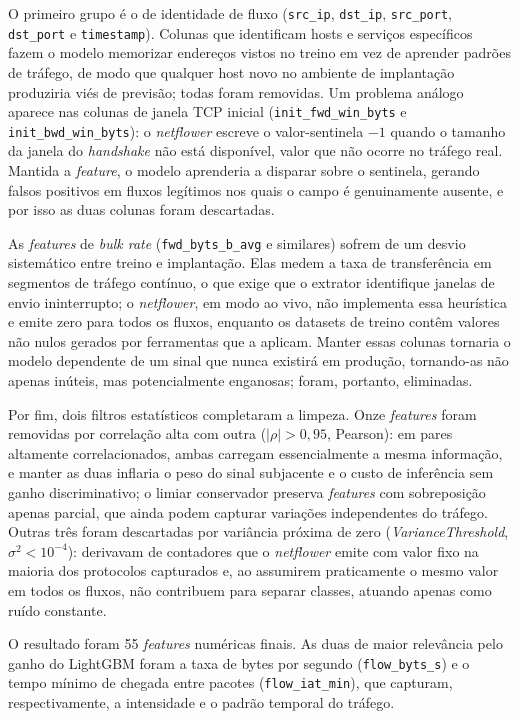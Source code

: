 \documentclass[12pt]{article}
\begin{document}
O primeiro grupo é o de identidade de fluxo (\texttt{src\_ip},
\texttt{dst\_ip}, \texttt{src\_port}, \texttt{dst\_port} e
\texttt{timestamp}). Colunas que identificam hosts e serviços específicos fazem
o modelo memorizar endereços vistos no treino em vez de aprender padrões de
tráfego, de modo que qualquer host novo no ambiente de implantação produziria
viés de previsão; todas foram removidas. Um problema análogo aparece nas colunas
de janela TCP inicial (\texttt{init\_fwd\_win\_byts} e
\texttt{init\_bwd\_win\_byts}): o \textit{netflower} escreve o valor-sentinela
$-1$ quando o tamanho da janela do \textit{handshake} não está disponível, valor
que não ocorre no tráfego real. Mantida a \textit{feature}, o modelo aprenderia
a disparar sobre o sentinela, gerando falsos positivos em fluxos legítimos nos
quais o campo é genuinamente ausente, e por isso as duas colunas foram
descartadas.

As \textit{features} de \textit{bulk rate} (\texttt{fwd\_byts\_b\_avg} e
similares) sofrem de um desvio sistemático entre treino e implantação. Elas
medem a taxa de transferência em segmentos de tráfego contínuo, o que exige que
o extrator identifique janelas de envio ininterrupto; o \textit{netflower}, em
modo ao vivo, não implementa essa heurística e emite zero para todos os fluxos,
enquanto os datasets de treino contêm valores não nulos gerados por ferramentas
que a aplicam. Manter essas colunas tornaria o modelo dependente de um sinal que
nunca existirá em produção, tornando-as não apenas inúteis, mas potencialmente
enganosas; foram, portanto, eliminadas.

Por fim, dois filtros estatísticos completaram a limpeza. Onze
\textit{features} foram removidas por correlação alta com outra ($|\rho| >
0{,}95$, Pearson): em pares altamente correlacionados, ambas carregam
essencialmente a mesma informação, e manter as duas inflaria o peso do sinal
subjacente e o custo de inferência sem ganho discriminativo; o limiar
conservador preserva \textit{features} com sobreposição apenas parcial, que
ainda podem capturar variações independentes do tráfego. Outras três foram
descartadas por variância próxima de zero (\textit{VarianceThreshold},
$\sigma^2 < 10^{-4}$): derivavam de contadores que o \textit{netflower} emite
com valor fixo na maioria dos protocolos capturados e, ao assumirem praticamente
o mesmo valor em todos os fluxos, não contribuem para separar classes, atuando
apenas como ruído constante.

O resultado foram 55 \textit{features} numéricas finais. As duas de maior
relevância pelo ganho do LightGBM foram a taxa de bytes
por segundo (\texttt{flow\_byts\_s}) e o tempo mínimo de chegada entre pacotes (\texttt{flow\_iat\_min}),
que capturam, respectivamente, a intensidade e o padrão temporal do tráfego.
\end{document}
